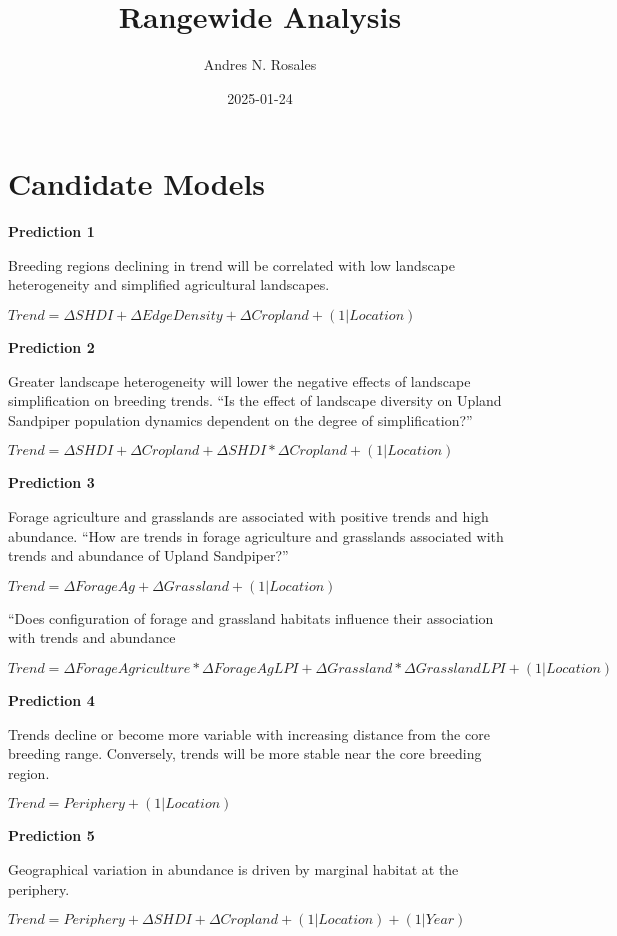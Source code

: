 \documentclass[
]{article}
\title{Rangewide Analysis}
\author{Andres N. Rosales}
\date{2025-01-24}
\begin{document}
\maketitle

{
\setcounter{tocdepth}{2}
\tableofcontents
}
\section{Candidate Models}\label{candidate-models}

\textbf{Prediction 1}

Breeding regions declining in trend will be correlated with low
landscape heterogeneity and simplified agricultural landscapes.

\(Trend = Δ SHDI + Δ Edge Density + Δ Cropland + (1 | Location)\)

\textbf{Prediction 2}

Greater landscape heterogeneity will lower the negative effects of
landscape simplification on breeding trends. ``Is the effect of
landscape diversity on Upland Sandpiper population dynamics dependent on
the degree of simplification?''

\(Trend = Δ SHDI + Δ Cropland + Δ SHDI * Δ Cropland + (1 | Location)\)

\textbf{Prediction 3}

Forage agriculture and grasslands are associated with positive trends
and high abundance. ``How are trends in forage agriculture and
grasslands associated with trends and abundance of Upland Sandpiper?''

\(Trend = Δ Forage Ag + Δ Grassland + (1 | Location)\)

``Does configuration of forage and grassland habitats influence their
association with trends and abundance

\(Trend = Δ Forage Agriculture * Δ Forage Ag LPI + Δ Grassland *  Δ Grassland LPI + (1 | Location)\)

\textbf{Prediction 4}

Trends decline or become more variable with increasing distance from the
core breeding range. Conversely, trends will be more stable near the
core breeding region.

\(Trend = Periphery + (1 | Location)\)

\textbf{Prediction 5}

Geographical variation in abundance is driven by marginal habitat at the
periphery.

\(Trend = Periphery + Δ SHDI +  Δ Cropland + (1 | Location) + (1| Year)\)
\end{document}
